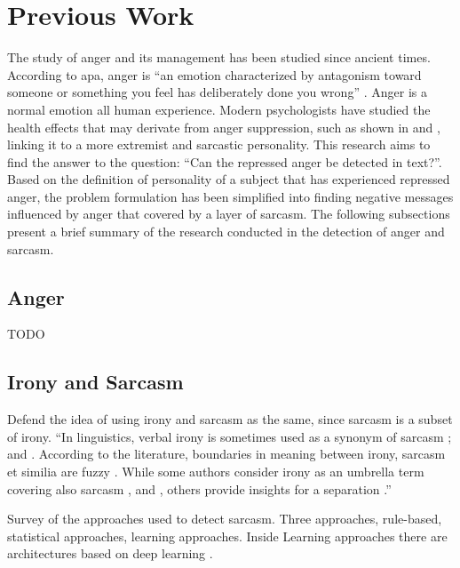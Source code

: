 
\section{Previous Work}
\label{sec:previous_work}

The study of anger and its management has been studied since ancient times. According to \acrfull{apa}, anger is ``an emotion characterized by antagonism toward someone or something you feel has deliberately done you wrong'' \cite{angerAPA}. Anger is a normal emotion all human experience. Modern psychologists have studied the health effects that may derivate from anger suppression, such as shown in \cite{kemp1995anger} and \cite{staicu2010anger}, linking it to a more extremist and sarcastic personality. This research aims to find the answer to the question: ``Can the repressed anger be detected in text?''. Based on the definition of personality of a subject that has experienced repressed anger, the problem formulation has been simplified into finding negative messages influenced by anger that covered by a layer of sarcasm. The following subsections present a brief summary of the research conducted in the detection of anger and sarcasm.

\subsection{Anger}
\label{subsec:anger}

TODO

\subsection{Irony and Sarcasm}
\label{subsec:irony_sarcasm}



Defend the idea of using irony and sarcasm as the same, since sarcasm is a subset of irony.
``In linguistics, verbal irony is sometimes used as a synonym of sarcasm \cite{giora2013negation}; \cite{giora2015defaultness} and \cite{giora2015default}. According to the literature, boundaries in meaning between irony, sarcasm et similia are fuzzy \cite{bosco2013developing}. While some authors consider irony as an umbrella term covering also sarcasm \cite{gibbs1991psychological}, \cite{wilson2006pragmatics} and \cite{kreuz1993empirical}, others provide insights for a separation \cite{filatova2012irony}.''


Survey of the approaches used to detect sarcasm. Three approaches, rule-based, statistical approaches, learning approaches. Inside Learning approaches there are architectures based on deep learning \cite{joshi2016automatic}.

